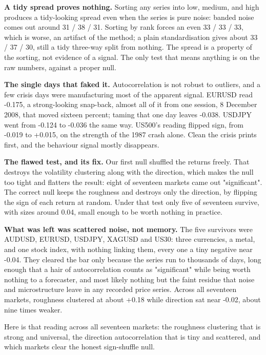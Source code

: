 \documentclass[11pt]{article} %
\begin{document}
\textbf{A tidy spread proves nothing.} Sorting any series into low, medium, and high produces a tidy-looking spread even when the series is pure noise: banded noise comes out around 31 / 38 / 31. Sorting by rank forces an even 33 / 33 / 33, which is worse, an artifact of the method; a plain standardisation gives about 33 / 37 / 30, still a tidy three-way split from nothing. The spread is a property of the sorting, not evidence of a signal. The only test that means anything is on the raw numbers, against a proper null.

\textbf{The single days that faked it.} Autocorrelation is not robust to outliers, and a few crisis days were manufacturing most of the apparent signal. EURUSD read -0.175, a strong-looking snap-back, almost all of it from one session, 8 December 2008, that moved sixteen percent; taming that one day leaves -0.038. USDJPY went from -0.124 to -0.036 the same way. US500's reading flipped sign, from -0.019 to +0.015, on the strength of the 1987 crash alone. Clean the crisis prints first, and the behaviour signal mostly disappears.

\textbf{The flawed test, and its fix.} Our first null shuffled the returns freely. That destroys the volatility clustering along with the direction, which makes the null too tight and flatters the result: eight of seventeen markets came out "significant". The correct null keeps the roughness and destroys only the direction, by flipping the sign of each return at random. Under that test only five of seventeen survive, with sizes around 0.04, small enough to be worth nothing in practice.

\textbf{What was left was scattered noise, not memory.} The five survivors were AUDUSD, EURUSD, USDJPY, XAGUSD and US30: three currencies, a metal, and one stock index, with nothing linking them, every one a tiny negative near -0.04. They cleared the bar only because the series run to thousands of days, long enough that a hair of autocorrelation counts as "significant" while being worth nothing to a forecaster, and most likely nothing but the faint residue that noise and microstructure leave in any recorded price series. Across all seventeen markets, roughness clustered at about +0.18 while direction sat near -0.02, about nine times weaker.

Here is that reading across all seventeen markets: the roughness clustering that is strong and universal, the direction autocorrelation that is tiny and scattered, and which markets clear the honest sign-shuffle null.
\end{document}
